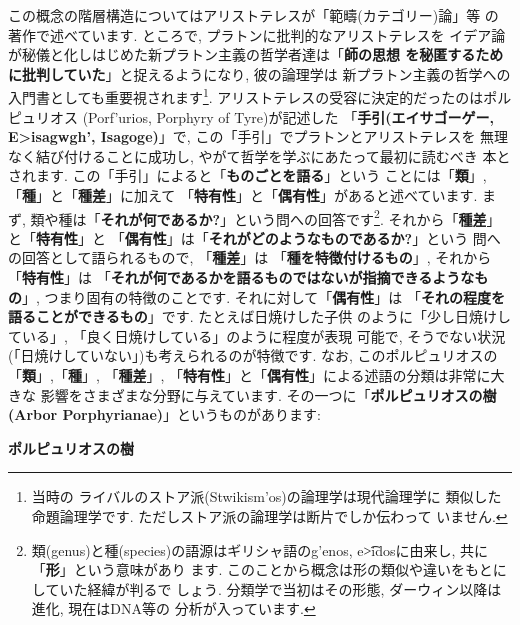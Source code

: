 この概念の階層構造についてはアリストテレスが「範疇(カテゴリー)論」等
の著作で述べています. ところで, プラトンに批判的なアリストテレスを
イデア論が秘儀と化しはじめた新プラトン主義の哲学者達は「\textbf{師の思想
を秘匿するために批判していた}」と捉えるようになり, 彼の論理学は
新プラトン主義の哲学への入門書としても重要視されます\footnote{当時の
ライバルのストア派(\textgreek{Stwikism'os})の論理学は現代論理学に
類似した命題論理学です. ただしストア派の論理学は断片でしか伝わって
いません.}. アリストテレスの受容に決定的だったのはポルピュリオス
(\textgreek{Porf'urios}, Porphyry of Tyre)が記述した
「\textbf{手引(エイサゴーゲー, \textgreek{E>isagwgh'},
 Isagoge\cite{Barnes})}」で, この「手引」でプラトンとアリストテレスを
無理なく結び付けることに成功し, やがて哲学を学ぶにあたって最初に読むべき
本とされます. この「手引」によると「\textbf{ものごとを語る}」という
ことには「\textbf{類}」, 「\textbf{種}」と「\textbf{種差}」に加えて
「\textbf{特有性}」と「\textbf{偶有性}」があると述べています. まず,
 類や種は「\textbf{それが何であるか?}」という問への回答です\footnote{
類(genus)と種(species)の語源はギリシャ語の\textgreek{g'enos}, 
 \textgreek{e\t{>i}dos}に由来し, 共に「\textbf{形}」という意味があり
ます. このことから概念は形の類似や違いをもとにしていた経緯が判るで
しょう. 分類学で当初はその形態, ダーウィン以降は進化, 現在はDNA等の
分析が入っています.}. それから「\textbf{種差}」と「\textbf{特有性}」と
「\textbf{偶有性}」は「\textbf{それがどのようなものであるか?}」という
問への回答として語られるもので, 「\textbf{種差}」は
「\textbf{種を特徴付けるもの}」, それから「\textbf{特有性}」は
「\textbf{それが何であるかを語るものではないが指摘できるようなもの}」,
 つまり固有の特徴のことです. それに対して「\textbf{偶有性}」は
「\textbf{それの程度を語ることができるもの}」です. たとえば日焼けした子供
のように「少し日焼けしている」, 「良く日焼けしている」のように程度が表現
可能で, そうでない状況(「日焼けしていない」)も考えられるのが特徴です. なお,
 このポルピュリオスの「\textbf{類}」,「\textbf{種}」, 「\textbf{種差}」,
 「\textbf{特有性}」と「\textbf{偶有性}」による述語の分類は非常に大きな
影響をさまざまな分野に与えています. その一つに「\textbf{ポルピュリオスの樹
(Arbor Porphyrianae)}」というものがあります:


\begin{itembox}[c]{\textbf{ポルピュリオスの樹}}
{\tiny
{}
}
\end{itembox}


